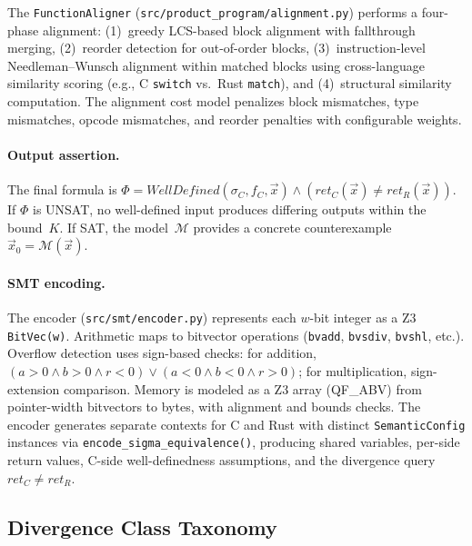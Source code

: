 \documentclass[10pt,a4paper]{article}
\begin{document}
The \texttt{FunctionAligner}
(\texttt{src/product\_program/alignment.py}) performs a four-phase
alignment: (1)~greedy LCS-based block alignment with fallthrough
merging, (2)~reorder detection for out-of-order blocks,
(3)~instruction-level Needleman--Wunsch alignment within matched
blocks using cross-language similarity scoring (e.g., C
\texttt{switch} vs.\ Rust \texttt{match}), and (4)~structural
similarity computation.  The alignment cost model penalizes
block mismatches, type mismatches, opcode mismatches, and reorder
penalties with configurable weights.

\paragraph{Output assertion.}
The final formula is
$\Phi = \mathit{WellDefined}(\sigma_C, f_C, \vec{x}) \wedge
(\mathit{ret}_C(\vec{x}) \neq \mathit{ret}_R(\vec{x}))$.
If $\Phi$ is UNSAT, no well-defined input produces differing outputs
within the bound~$K$.  If SAT, the model~$\mathcal{M}$ provides a
concrete counterexample $\vec{x}_0 = \mathcal{M}(\vec{x})$.

\paragraph{SMT encoding.}
The encoder (\texttt{src/smt/encoder.py}) represents each $w$-bit
integer as a Z3 \texttt{BitVec(w)}.  Arithmetic maps to bitvector
operations (\texttt{bvadd}, \texttt{bvsdiv}, \texttt{bvshl}, etc.).
Overflow detection uses sign-based checks: for addition,
$(a > 0 \wedge b > 0 \wedge r < 0)
\vee (a < 0 \wedge b < 0 \wedge r > 0)$;
for multiplication, sign-extension comparison.
Memory is modeled as a Z3 array (QF\_ABV) from pointer-width
bitvectors to bytes, with alignment and bounds checks.  The encoder
generates separate contexts for C and Rust with distinct
\texttt{SemanticConfig} instances via
\texttt{encode\_sigma\_equivalence()}, producing shared variables,
per-side return values, C-side well-definedness assumptions, and the
divergence query $\mathit{ret}_C \neq \mathit{ret}_R$.

\subsection{Divergence Class Taxonomy}\label{sec:divergence-taxonomy}
\end{document}
